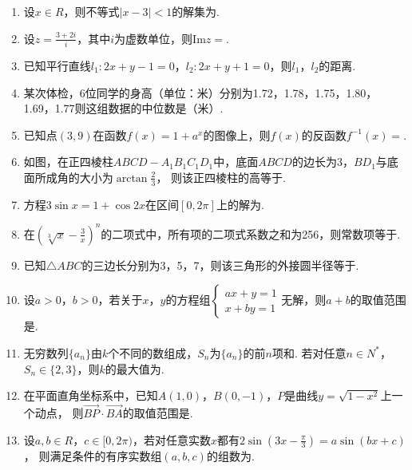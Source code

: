 \documentclass[12pt,space]{ctexart} %
\begin{document}
\begin{enumerate}[itemsep=-0.3em,topsep=0pt]

  \item 设$x\in R$，则不等式$|x-3|<1$的解集为.
  \item 设$\displaystyle{z=\frac{3+2i}{i}}$，其中$i$为虚数单位，则$\text{Im} z=$.
  \item 已知平行直线$l_1: 2x+y-1=0$，$l_2: 2x+y+1=0$，则$l_1$，$l_2$的距离.
  \item 某次体检，6位同学的身高（单位：米）分别为1.72，1.78，1.75，1.80，1.69，1.77则这组数据的中位数是（米）.
  \item 已知点$(3,9)$在函数$f(x)=1+a^x$的图像上，则$f(x)$的反函数$f^{-1}(x)=$.
  \item 如图，在正四棱柱$ABCD-A_1B_1C_1D_1$中，底面$ABCD$的边长为3，$BD_1$与底面所成角的大小为$\displaystyle{\arctan{\frac{2}{3}}}$，
        则该正四棱柱的高等于.
  \item 方程$3\sin x=1+\cos 2x$在区间$[0,2\pi]$上的解为.
  \item 在$\displaystyle{\left (\sqrt[3]{x}-\frac{3}{x}\right )^n}$的二项式中，所有项的二项式系数之和为256，则常数项等于.
  \item 已知$\triangle ABC$的三边长分别为3，5，7，则该三角形的外接圆半径等于.
  \item 设$a>0$，$b>0$，若关于$x$，$y$的方程组$\begin{cases}ax+y=1\\x+by=1\end{cases}$无解，则$a+b$的取值范围是\blank{$[2,+\infty)$}.
  \item 无穷数列$\{a_n\}$由$k$个不同的数组成，$S_n$为$\{a_n\}$的前$n$项和. 若对任意$n\in N^*$，$S_n\in \{2,3\}$，则$k$的最大值为.
  \item 在平面直角坐标系中，已知$A(1,0)$，$B(0,-1)$，$P$是曲线$y=\sqrt{1-x^2}$上一个动点，
        则$\overrightarrow{BP}\cdot \overrightarrow{BA}$的取值范围是\blank{$[0,1+\sqrt{2}]$}.
  \item 设$a,b\in R$，$c\in [0,2\pi)$，若对任意实数$x$都有$\displaystyle{2\sin\left (3x-\frac{\pi}{3}\right )=a\sin(bx+c)}$，
        则满足条件的有序实数组$(a,b,c)$的组数为.


\end{enumerate}
\end{document}
